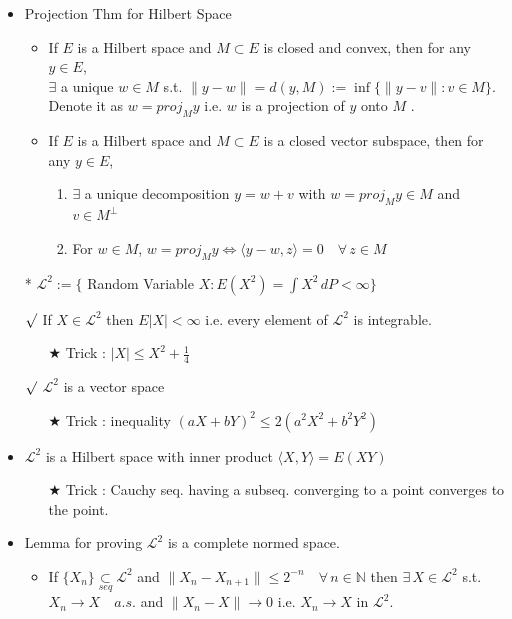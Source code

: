 \documentclass[12pt, A4]{article}
\newcommand{\rmk}{$\surd$}
\newcommand{\trick}{$\bigstar$}
\newcommand{\N}{\mathbb{N}}
\newcommand{\LL}{\mathcal{L}}
\newcommand{\seq}{\underset{seq}{\subset}}
\newcommand{\exist}{\exists\,}
\newcommand{\foranyn}{\quad \forall \, n\in \N}
\begin{document}
\begin{itemize}
    \item Projection Thm for Hilbert Space
    \begin{itemize}
        \item If $E$ is a Hilbert space and $M\subset E$ is closed and convex, then for any $y\in E$, \\$\exists$ a unique $w\in M$ s.t. $\|y-w\|=d(y, M):=\inf\{\|y-v\|:v\in M\}$. \\ Denote it as $w=proj_{M}y$ \; i.e. $w$ is a projection of $y$ onto $M$ . 
		\item If $E$ is a Hilbert space and $M\subset E$ is a closed vector subspace, then for any $y\in E$, 
		\begin{enumerate}
			\item $\exists$ a unique decomposition $y=w+v$ with $w=proj_M y\in M$ and $v\in M^{\perp}$ 
			\item For $w\in M$, \quad $ w=proj_M y \Leftrightarrow \langle y-w, z\rangle =0 \quad  \forall \, z\in M$
		\end{enumerate}
	\end{itemize}
	\item[*] $\LL^2:=\{$ Random Variable $ X : E(X^2)=\int X^2\,dP<\infty\}$
	\item[\rmk] If $X\in \LL^2$ then $E|X|<\infty$ \; i.e. every element of $\LL^2$ is integrable.
	\begin{itemize}
		\item[\trick] Trick : $|X|\leq X^2+\frac{1}{4}$
	\end{itemize} 
	\item[\rmk] $\LL^2$ is a vector space
	\begin{itemize}
		\item[\trick] Trick : inequality $(aX+bY)^2\leq 2(a^2 X^2+b^2Y^2)$
	\end{itemize}  
	\item $\LL^2$ is a Hilbert space with inner product $\langle X, Y\rangle = E(XY)$ 
	\begin{itemize}
		\item[\trick] Trick :  Cauchy seq. having a subseq. converging to a point converges to the point. 
	\end{itemize}
	\item Lemma for proving $\LL^2$ is a complete normed space.
	\begin{itemize}
		\item If $\{X_n\}\seq \LL^2$ and $\|X_n-X_{n+1}\|\leq 2^{-n}\foranyn$ then $\exist X\in \LL^2$ s.t. $X_n\rightarrow X \quad a.s.$ and $\|X_n-X\|\rightarrow 0$ \;i.e. $X_n\rightarrow X$ in $\LL^2$.

\end{itemize}
\end{itemize}
\end{document}
